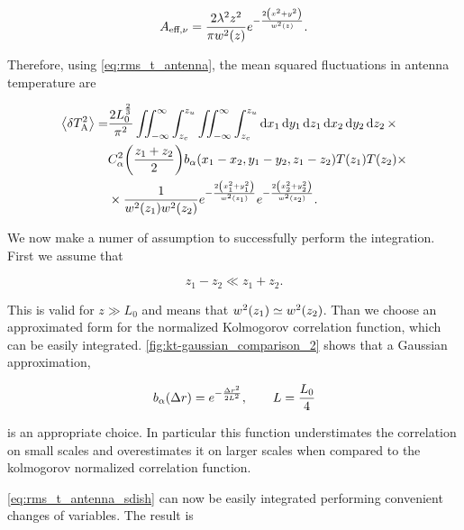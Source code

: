 \begin{equation}
        A_{\text{eff},\nu} = \frac{2\lambda^2 z^2}{\pi w^2\qty(z)}
        e^{-\frac{2 \qty(x^2 + y^2)}{w^2\qty(z)}}.
\end{equation}

Therefore, using \autoref{eq:rms_t_antenna}, the mean squared fluctuations
in antenna temperature are

\begin{equation}
        \begin{split}
                \expval{\var{T^2_\text{A}}} = & \frac{2 L^\frac{2}{3}_0}{\pi^2}
                \iint^\infty_{-\infty} \int^{z_u}_{z_c}
                \iint^\infty_{-\infty} \int^{z_u}_{z_c}
                \dd{x_1}\dd{y_1}\dd{z_1}\dd{x_2}\dd{y_2}\dd{z_2} \times \\
                & C^2_\alpha\qty(\frac{z_1 + z_2}{2})
                b_\alpha\qty(x_1 - x_2, y_1 - y_2, z_1 - z_2)
                T\qty(z_1) T\qty(z_2) \times \\
                & \times \frac{1}{w^2\qty(z_1) w^2\qty(z_2)}
                e^{-\frac{2\qty(x^2_1 + y^2_1)}{w^2\qty(z_1)}}
                e^{-\frac{2\qty(x^2_2 + y^2_2)}{w^2\qty(z_2)}}.
        \end{split}
        \label{eq:rms_t_antenna_sdish}
\end{equation}

We now make a numer of assumption to successfully perform the integration.
First we assume that

\begin{equation}
        z_1 - z_2 \ll z_1 + z_2.
\end{equation}

This is valid for $z \gg L_0$ and means that $w^2\qty(z_1) \simeq
w^2\qty(z_2)$. Than we choose an approximated form for the normalized
Kolmogorov correlation function, which can be easily integrated.
\autoref{fig:kt-gaussian_comparison_2} shows that a Gaussian approximation,

\begin{equation}
        b_\alpha\qty(\Delta r) = e^{-\frac{\Delta r^2}{2L^2}},
        \qquad L = \frac{L_0}{4}
\end{equation}

is an appropriate choice. In particular this function understimates the
correlation on small scales and overestimates it on larger scales when
compared to the kolmogorov normalized correlation function.

\autoref{eq:rms_t_antenna_sdish} can now be easily integrated performing
convenient changes of variables. The result is

